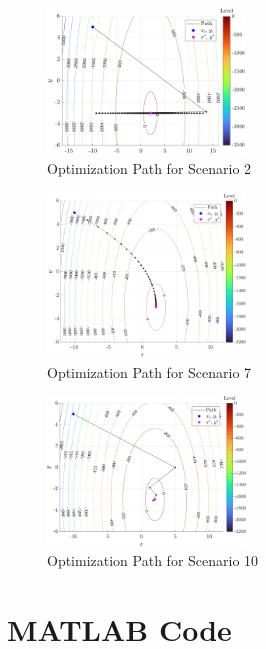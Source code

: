 \documentclass{article}
\begin{document}
\pagebreak

\begin{figure}[h]
    \centering
    \includegraphics[width = 0.47\textwidth]{fig/scenario2.png}
    \caption{Optimization Path for Scenario 2}
    \label{fig:scenario2}
\end{figure}

\begin{figure}[h]
    \centering
    \includegraphics[width = 0.47\textwidth]{fig/scenario7.png}
    \caption{Optimization Path for Scenario 7}
    \label{fig:scenario7}
\end{figure}

\begin{figure}[h!]
    \centering
    \includegraphics[width = 0.47\textwidth]{fig/scenario10.png}
    \caption{Optimization Path for Scenario 10}
    \label{fig:scenario10}
\end{figure}

\pagebreak

\section{MATLAB Code}


\end{document}
